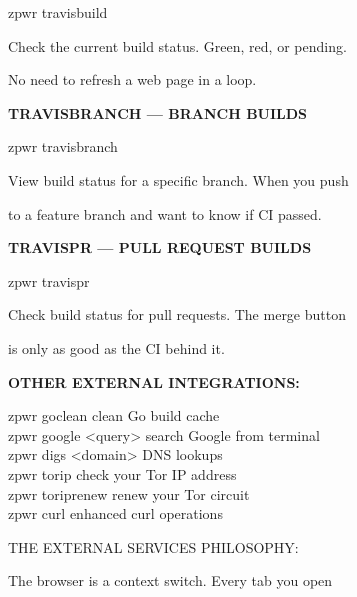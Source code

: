 \documentclass[11pt,a4paper,twoside]{book}
\begin{document}
\begin{codebox}
zpwr travisbuild\\
\end{codebox}

Check the current build status. Green, red, or pending.

No need to refresh a web page in a loop.


\vspace{12pt}
{\bfseries\color{neonyellow} TRAVISBRANCH — BRANCH BUILDS}\vspace{4pt}

\begin{codebox}
zpwr travisbranch\\
\end{codebox}

View build status for a specific branch. When you push

to a feature branch and want to know if CI passed.


\vspace{12pt}
{\bfseries\color{neonyellow} TRAVISPR — PULL REQUEST BUILDS}\vspace{4pt}

\begin{codebox}
zpwr travispr\\
\end{codebox}

Check build status for pull requests. The merge button

is only as good as the CI behind it.


\vspace{12pt}
{\bfseries\color{neonyellow} OTHER EXTERNAL INTEGRATIONS:}\vspace{4pt}

\begin{codebox}
zpwr goclean          clean Go build cache\\
zpwr google <query>    search Google from terminal\\
zpwr digs <domain>     DNS lookups\\
zpwr torip            check your Tor IP address\\
zpwr toriprenew       renew your Tor circuit\\
zpwr curl             enhanced curl operations\\
\end{codebox}

THE EXTERNAL SERVICES PHILOSOPHY:

The browser is a context switch. Every tab you open
\end{document}

